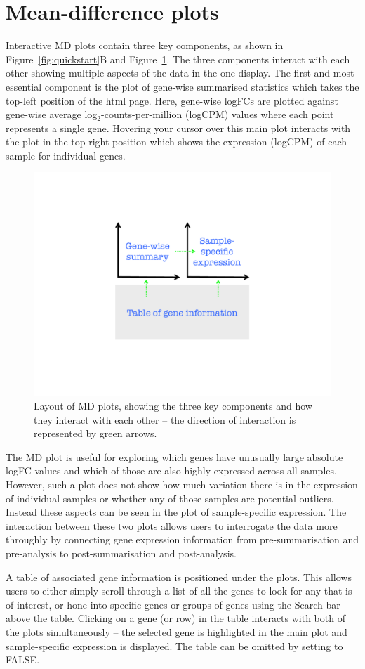\documentclass{article}
\newcommand{\Rarg}[1]{\textcolor{BlueGreen}{{\sf{#1}}}}
\begin{document}
\section{Mean-difference plots}

Interactive MD plots contain three key components, as shown in Figure~\ref{fig:quickstart}B and Figure~\ref{fig:layout}. The three components interact with each other showing multiple aspects of the data in the one display. The first and most essential component is the plot of gene-wise summarised statistics which takes the top-left position of the html page. Here, gene-wise logFCs are plotted against gene-wise average log$_2$-counts-per-million (logCPM) values where each point represents a single gene. Hovering your cursor over this main plot interacts with the plot in the top-right position which shows the expression (logCPM) of each sample for individual genes.

\begin{figure}[!ht]
  \centerline{\includegraphics[width=0.4\linewidth]{Glimma_plotlayout.pdf}}
  \caption{Layout of MD plots, showing the three key components and how they interact with each other -- the direction of interaction is represented by green arrows.}
  \label{fig:layout}
\end{figure}

The MD plot is useful for exploring which genes have unusually large absolute logFC values and which of those are also highly expressed across all samples. However, such a plot does not show how much variation there is in the expression of individual samples or whether any of those samples are potential outliers. Instead these aspects can be seen in the plot of sample-specific expression. The interaction between these two plots allows users to interrogate the data more throughly by connecting gene expression information from pre-summarisation and pre-analysis to post-summarisation and post-analysis.

A table of associated gene information is positioned under the plots. This allows users to either simply scroll through a list of all the genes to look for any that is of interest, or hone into specific genes or groups of genes using  the Search-bar above the table. Clicking on a gene (or row) in the table interacts with both of the plots simultaneously -- the selected gene is highlighted in the main plot and sample-specific expression is displayed. The table can be omitted by setting \Rarg{table} to {\sf FALSE}.
\end{document}
